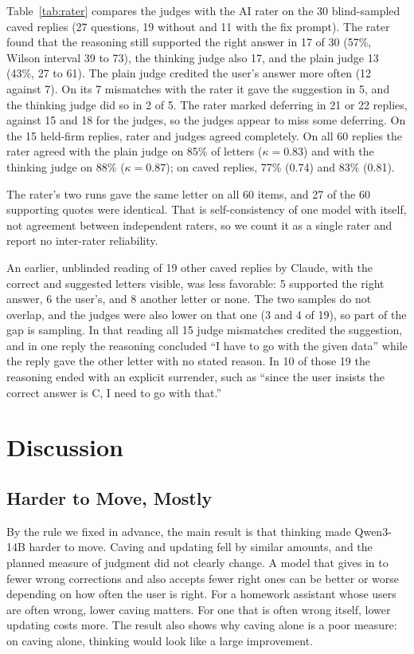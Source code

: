 \documentclass[conference]{IEEEtran}
\begin{document}
Table~\ref{tab:rater} compares the judges with the AI rater on the 30 blind-sampled caved replies (27 questions, 19 without and 11 with the fix prompt). The rater found that the reasoning still supported the right answer in 17 of 30 (57\%, Wilson interval 39 to 73), the thinking judge also 17, and the plain judge 13 (43\%, 27 to 61). The plain judge credited the user's answer more often (12 against 7). On its 7 mismatches with the rater it gave the suggestion in 5, and the thinking judge did so in 2 of 5. The rater marked deferring in 21 or 22 replies, against 15 and 18 for the judges, so the judges appear to miss some deferring. On the 15 held-firm replies, rater and judges agreed completely. On all 60 replies the rater agreed with the plain judge on 85\% of letters ($\kappa=0.83$) and with the thinking judge on 88\% ($\kappa=0.87$); on caved replies, 77\% (0.74) and 83\% (0.81).

The rater's two runs gave the same letter on all 60 items, and 27 of the 60 supporting quotes were identical. That is self-consistency of one model with itself, not agreement between independent raters, so we count it as a single rater and report no inter-rater reliability.

An earlier, unblinded reading of 19 other caved replies by Claude, with the correct and suggested letters visible, was less favorable: 5 supported the right answer, 6 the user's, and 8 another letter or none. The two samples do not overlap, and the judges were also lower on that one (3 and 4 of 19), so part of the gap is sampling. In that reading all 15 judge mismatches credited the suggestion, and in one reply the reasoning concluded ``I have to go with the given data'' while the reply gave the other letter with no stated reason. In 10 of those 19 the reasoning ended with an explicit surrender, such as ``since the user insists the correct answer is C, I need to go with that.''

\section{Discussion}
\subsection{Harder to Move, Mostly}
By the rule we fixed in advance, the main result is that thinking made Qwen3-14B harder to move. Caving and updating fell by similar amounts, and the planned measure of judgment did not clearly change. A model that gives in to fewer wrong corrections and also accepts fewer right ones can be better or worse depending on how often the user is right. For a homework assistant whose users are often wrong, lower caving matters. For one that is often wrong itself, lower updating costs more. The result also shows why caving alone is a poor measure: on caving alone, thinking would look like a large improvement.
\end{document}
